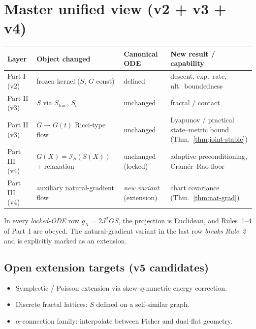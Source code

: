 \documentclass[11pt,oneside]{amsart}
\def\textbf#1{#1}%
\theoremstyle{plain}
\theoremstyle{definition}
\renewcommand{\arraystretch}{1.25}
\newcommand{\gX}{g_X}
\begin{document}
\section{Master unified view (v2 + v3 + v4)}
\label{sec:unified-master}

\begin{center}
\renewcommand{\arraystretch}{1.5}
\begin{tabularx}{\linewidth}{@{}l l l >{\RaggedRight\arraybackslash}X@{}}
\toprule
\textbf{Layer} & \textbf{Object changed} & \textbf{Canonical ODE} & \textbf{New result / capability} \\
\midrule
Part I (v2)    & frozen kernel ($S$, $G$ const) & defined           & descent, exp.\ rate, ult.\ boundedness \\
Part II (v3)   & $S$ via $S_{\mathrm{frac}}$, $S_{\mathrm{ct}}$  & unchanged & fractal / contact \\
Part II (v3)   & $G\to G(t)$ Ricci-type flow                     & unchanged & Lyapunov / practical state--metric bound (Thm.~\ref{thm:joint-stable}) \\
Part III (v4)  & $G(X)=\mathcal{I}_{S}(S(X))$ + relaxation         & unchanged (locked) & adaptive preconditioning, Cram\'er--Rao floor \\
Part III (v4)  & auxiliary natural-gradient flow                  & \emph{new variant} (extension) & chart covariance (Thm.~\ref{thm:nat-grad}) \\
\bottomrule
\end{tabularx}
\end{center}

\begin{lockbox}
In every \emph{locked-ODE} row $\gX = 2 J^{T}G S$, the projection is
Euclidean, and Rules~1--4 of Part~I are obeyed. The natural-gradient
variant in the last row \emph{breaks Rule~2} and is explicitly marked
as an extension.
\end{lockbox}

\subsection*{Open extension targets (v5 candidates)}
\begin{itemize}[leftmargin=1.8em,nosep]
  \item Symplectic / Poisson extension via skew-symmetric energy correction.
  \item Discrete fractal lattices: $S$ defined on a self-similar graph.
  \item $\alpha$-connection family: interpolate between Fisher and dual-flat geometry.
\end{itemize}
\end{document}

